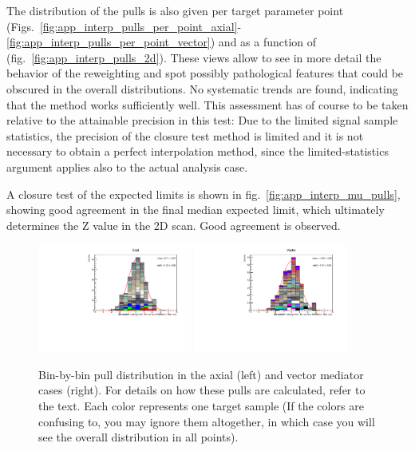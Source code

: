 The distribution of the pulls is also given per target parameter point (Figs.~\ref{fig:app_interp_pulls_per_point_axial}-\ref{fig:app_interp_pulls_per_point_vector}) and as a function of \MET (fig.~\ref{fig:app_interp_pulls_2d}). These views allow to see in more detail the behavior of the reweighting and spot possibly pathological features that could be obscured in the overall distributions. No systematic trends are found, indicating that the method works sufficiently well. This assessment has of course to be taken relative to the attainable precision in this test: Due to the limited signal sample statistics, the precision of the closure test method is limited and it is not necessary to obtain a perfect interpolation method, since the limited-statistics argument applies also to the actual analysis case.

A closure test of the expected limits is shown in fig.~\ref{fig:app_interp_mu_pulls}, showing good agreement in the final median expected limit, which ultimately determines the Z value in the 2D scan.  Good agreement is observed.


 \begin{figure}[htbp]
   \begin{center}
	\includegraphics[width=0.45\textwidth]{figures/interpolation_appendix/Axial_pulls.pdf}
	\includegraphics[width=0.45\textwidth]{figures/interpolation_appendix/Vector_pulls.pdf}
     \caption{Bin-by-bin pull distribution in the axial (left) and vector mediator cases (right).
				For details on how these pulls are calculated, refer to the text. Each color represents one target sample
				(If the colors are confusing to, you may ignore them altogether, in which case you will see the overall distribution in all points).}
     \label{fig:app_interp_pulls}
   \end{center}
 \end{figure}

